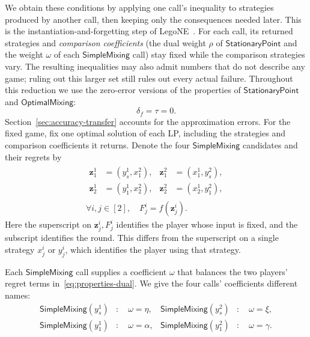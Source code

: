 \documentclass[11pt]{article}
\theoremstyle{remark}
\theoremstyle{plain}
\newcommand{\sm}{\mathsf{SimpleMixing}}
\newcommand{\om}{\mathsf{OptimalMixing}}
\newcommand{\spoint}{\mathsf{StationaryPoint}}
\begin{document}
We obtain these conditions by applying one call's inequality to
strategies produced by another call, then keeping only the
consequences needed later. This is the instantiation-and-forgetting
step of LegoNE~\cite{computeraided2026,legone2026}. For each call,
its returned strategies and \emph{comparison coefficients} (the dual
weight $\rho$ of $\spoint$ and the weight $\omega$ of each $\sm$
call) stay fixed while the comparison strategies vary. The resulting inequalities
may also admit numbers that do not describe any game; ruling out
this larger set still rules out every actual failure. Throughout
this reduction we use the zero-error versions of the properties of
$\spoint$ and $\om$:
\begin{equation}
 \delta_f=\tau=0.
 \label{eq:ideal-parameters}
\end{equation}
Section~\ref{sec:accuracy-transfer} accounts for the approximation errors.
For the fixed game, fix one optimal solution of each LP, including
the strategies and comparison coefficients it returns.
Denote the four $\sm$ candidates and their regrets by
\begin{equation}
 \begin{gathered}
 \begin{aligned}
 \boldsymbol z_1^1&=(y_s^1,x_1^2),&\boldsymbol z_1^2&=(x_1^1,y_s^2),\\
 \boldsymbol z_2^1&=(y_1^1,x_2^2),&\boldsymbol z_2^2&=(x_2^1,y_1^2),
 \end{aligned}\\
 \forall i,j\in[2],\quad F_j^i=f(\boldsymbol z_j^i).
 \end{gathered}
 \label{eq:candidate-profiles}
\end{equation}
Here the superscript on $\boldsymbol z_j^i,F_j^i$ identifies the
player whose input is fixed, and the subscript identifies the round.
This differs from the superscript on a single strategy $x_j^i$ or
$y_j^i$, which identifies the player using that strategy.

Each $\sm$ call supplies a coefficient $\omega$ that balances the
two players' regret terms in~\eqref{eq:properties-dual}. We give
the four calls' coefficients different names:
\begin{equation}
 \begin{aligned}
 \sm(y_s^1)&:\quad\omega=\eta,&\sm(y_s^2)&:\quad\omega=\xi,\\
 \sm(y_1^1)&:\quad\omega=\alpha,&\sm(y_1^2)&:\quad\omega=\gamma.
 \end{aligned}
 \label{eq:call-weight-definitions}
\end{equation}
\end{document}
